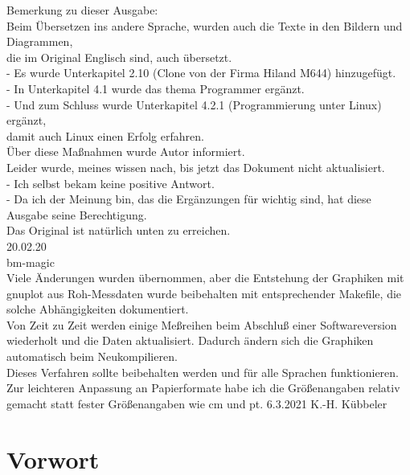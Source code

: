 Bemerkung zu dieser Ausgabe:
\vspace*{0.3cm}
\\Beim Übersetzen ins andere Sprache, wurden auch die Texte in den Bildern und Diagrammen,
\\die im Original Englisch sind, auch übersetzt.
\\- Es wurde Unterkapitel 2.10 (Clone von der Firma Hiland M644) hinzugefügt.
\\- In Unterkapitel 4.1 wurde das thema Programmer ergänzt.
\\- Und zum Schluss wurde Unterkapitel 4.2.1 (Programmierung unter Linux) ergänzt,
\\damit auch Linux  einen Erfolg erfahren.
\vspace*{0.3cm}
\\Über diese Maßnahmen wurde Autor informiert.
\\Leider wurde, meines wissen nach, bis jetzt das Dokument nicht aktualisiert.
\\- Ich selbst bekam keine positive Antwort.
\\- Da ich der Meinung bin, das die Ergänzungen für  wichtig sind, hat diese Ausgabe seine Berechtigung.
\vspace*{0.3cm}
\\Das Original ist natürlich unten \cite{khk} zu erreichen.
\vspace*{0.2cm}
\\20.02.20
\\ bm-magic \\

Viele Änderungen wurden übernommen, aber die Entstehung der Graphiken mit gnuplot aus Roh-Messdaten
wurde beibehalten mit entsprechender Makefile, die solche Abhängigkeiten dokumentiert.\\
Von Zeit zu Zeit werden einige Meßreihen beim Abschluß einer Softwareversion wiederholt und
die Daten aktualisiert. Dadurch ändern sich die Graphiken automatisch beim Neukompilieren.\\
Dieses Verfahren sollte beibehalten werden und für alle Sprachen funktionieren.\\
Zur leichteren Anpassung an Papierformate habe ich die Größenangaben relativ gemacht statt
fester Größenangaben wie cm und pt.
\vspace*{0.2cm}
6.3.2021
K.-H. Kübbeler




\newpage
\section*{Vorwort}

